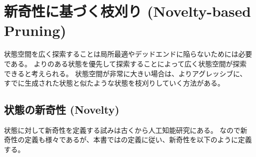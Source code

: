 





\section{新奇性に基づく枝刈り (Novelty-based Pruning)}
\label{sec:novelty-based-pruning}

状態空間を広く探索することは局所最適やデッドエンドに陥らないためには必要である。
よりのある状態を優先して探索することによって広く状態空間が探索できると考えられる。
状態空間が非常に大きい場合は、よりアグレッシブに、すでに生成された状態と似たような状態を枝刈りしていく方法がある。




\subsection{状態の新奇性 (Novelty)}
\label{sec:novelty}

状態に対して新奇性を定義する試みは古くから人工知能研究にある\cite{lehman2008exploiting}。
なので新奇性の定義も様々であるが、本書では\cite{geffner2015}の定義に従い、新奇性を以下のように定義する。


